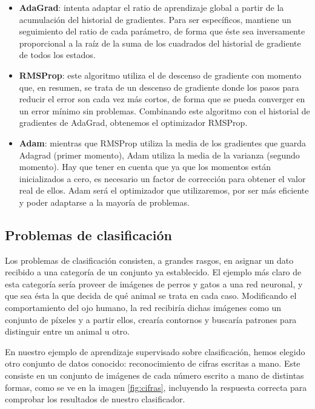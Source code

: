 \begin{itemize}
    \item \textbf{AdaGrad}: intenta adaptar el ratio de aprendizaje global a partir de la acumulación del historial de gradientes. Para ser específicos, mantiene un seguimiento del ratio de cada parámetro, de forma que éste sea inversamente proporcional a la raíz de la suma de los cuadrados del historial de gradiente de todos los estados. 
    \item \textbf{RMSProp}: este algoritmo utiliza el de descenso de gradiente con momento que, en resumen, se trata de un descenso de gradiente donde los pasos para reducir el error son cada vez más cortos, de forma que se pueda converger en un error mínimo sin problemas. Combinando este algoritmo con el historial de gradientes de AdaGrad, obtenemos el optimizador RMSProp. 
    \item \textbf{Adam}: mientras que RMSProp utiliza la media de los gradientes que guarda Adagrad (primer momento), Adam utiliza la media de la varianza (segundo momento). Hay que tener en cuenta que ya que los momentos están inicializados a cero, es necesario un factor de corrección para obtener el valor real de ellos. Adam será el optimizador que utilizaremos, por ser más eficiente y poder adaptarse a la mayoría de problemas. 
\end{itemize}

\subsection{Problemas de clasificación}
Los problemas de clasificación consisten, a grandes rasgos, en asignar un dato recibido a una categoría de un conjunto ya establecido. El ejemplo más claro de esta categoría sería proveer de imágenes de perros y gatos a una red neuronal, y que sea ésta la que decida de qué animal se trata en cada caso. Modificando el comportamiento del ojo humano, la red recibiría dichas imágenes como un conjunto de píxeles y a partir ellos, crearía contornos y buscaría patrones para distinguir entre un animal u otro.

En nuestro ejemplo de aprendizaje supervisado sobre clasificación, hemos elegido otro conjunto de datos conocido: reconocimiento de cifras escritas a mano. Este consiste en un conjunto de imágenes de cada número escrito a mano de distintas formas, como se ve en la imagen \ref{fig:cifras}, incluyendo la respuesta correcta para comprobar los resultados de nuestro clasificador.

